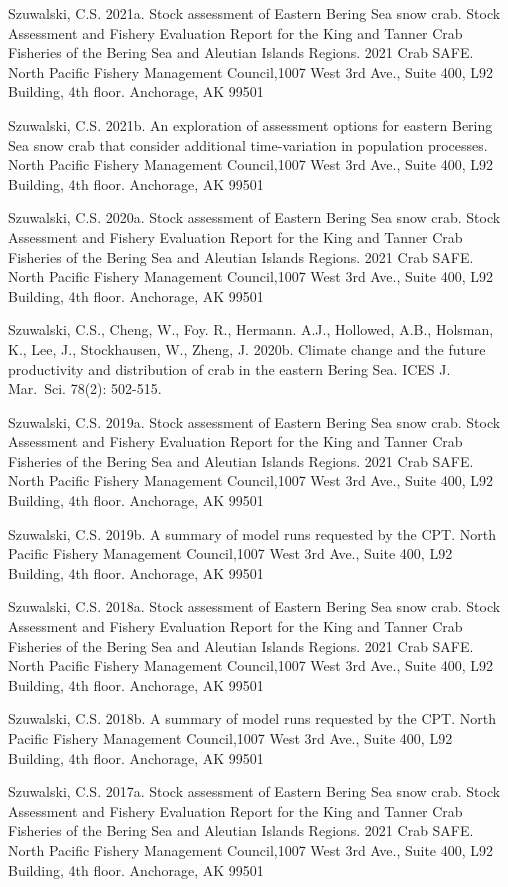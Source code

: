 \documentclass[
]{article}
\begin{document}
Szuwalski, C.S. 2021a. Stock assessment of Eastern Bering Sea snow crab. Stock Assessment and Fishery Evaluation Report for the King and Tanner Crab Fisheries of the Bering Sea and Aleutian Islands Regions. 2021 Crab SAFE. North Pacific Fishery Management Council,1007 West 3rd Ave., Suite 400, L92 Building, 4th floor. Anchorage, AK 99501

Szuwalski, C.S. 2021b. An exploration of assessment options for eastern Bering Sea snow crab that consider additional time-variation in population processes. North Pacific Fishery Management Council,1007 West 3rd Ave., Suite 400, L92 Building, 4th floor. Anchorage, AK 99501

Szuwalski, C.S. 2020a. Stock assessment of Eastern Bering Sea snow crab. Stock Assessment and Fishery Evaluation Report for the King and Tanner Crab Fisheries of the Bering Sea and Aleutian Islands Regions. 2021 Crab SAFE. North Pacific Fishery Management Council,1007 West 3rd Ave., Suite 400, L92 Building, 4th floor. Anchorage, AK 99501

Szuwalski, C.S., Cheng, W., Foy. R., Hermann. A.J., Hollowed, A.B., Holsman, K., Lee, J., Stockhausen, W., Zheng, J. 2020b. Climate change and the future productivity and distribution of crab in the eastern Bering Sea. ICES J. Mar.~Sci. 78(2): 502-515.

Szuwalski, C.S. 2019a. Stock assessment of Eastern Bering Sea snow crab. Stock Assessment and Fishery Evaluation Report for the King and Tanner Crab Fisheries of the Bering Sea and Aleutian Islands Regions. 2021 Crab SAFE. North Pacific Fishery Management Council,1007 West 3rd Ave., Suite 400, L92 Building, 4th floor. Anchorage, AK 99501

Szuwalski, C.S. 2019b. A summary of model runs requested by the CPT. North Pacific Fishery Management Council,1007 West 3rd Ave., Suite 400, L92 Building, 4th floor. Anchorage, AK 99501

Szuwalski, C.S. 2018a. Stock assessment of Eastern Bering Sea snow crab. Stock Assessment and Fishery Evaluation Report for the King and Tanner Crab Fisheries of the Bering Sea and Aleutian Islands Regions. 2021 Crab SAFE. North Pacific Fishery Management Council,1007 West 3rd Ave., Suite 400, L92 Building, 4th floor. Anchorage, AK 99501

Szuwalski, C.S. 2018b. A summary of model runs requested by the CPT. North Pacific Fishery Management Council,1007 West 3rd Ave., Suite 400, L92 Building, 4th floor. Anchorage, AK 99501

Szuwalski, C.S. 2017a. Stock assessment of Eastern Bering Sea snow crab. Stock Assessment and Fishery Evaluation Report for the King and Tanner Crab Fisheries of the Bering Sea and Aleutian Islands Regions. 2021 Crab SAFE. North Pacific Fishery Management Council,1007 West 3rd Ave., Suite 400, L92 Building, 4th floor. Anchorage, AK 99501
\end{document}
